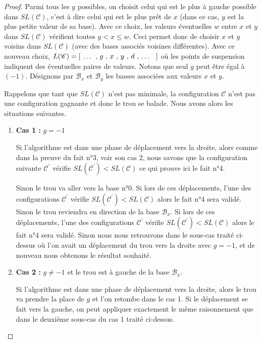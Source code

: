 \begin{proof}
    \medskip

    Parmi tous les $y$ possibles, on choisit celui qui est le plus à gauche possible dans $SL(\mathscr{C})$, c'est à dire celui qui est le plus prêt de $x$ (dans ce cas, $y$ est la plus petite valeur de sa base).
    Avec ce choix, les valeurs éventuelles $w$ entre $x$ et $y$ dans $SL(\mathscr{C})$ vérifient toutes $y < x \leqslant w$. Ceci permet donc de choisir $x$ et $y$ voisins dans $SL(\mathscr{C})$ (avec des bases associés voisines différentes).
    Avec ce nouveau choix, $L(\mathscr{C}) = [ \text{\ \dots{} , $g$ , $x$ , $y$ , $d$ , \dots{} \ } ]$ où les points de suspension indiquent des éventuelles paires de valeurs. Notons que seul $g$ peut être égal à $(-1)$.
    Désignons par $\mathcal{B}_x$ et $\mathcal{B}_y$ les basses associées aux valeurs $x$ et $y$.


    \medskip

    Rappelons que tant que $SL(\mathscr{C})$ n'est pas minimale, la configuration $\mathscr{C}$ n'est pas une configuration gagnante et donc le trou se balade. Nous avons alors les situations suivantes.

    \begin{enumerate}
        \item \textbf{Cas 1 :} $g = -1$

        Si l'algorithme est dans une phase de déplacement vers la droite, alors comme dans la preuve du fait n°3, voir son cas 2, nous savons que la configuration suivante $\mathscr{C}^\prime$ vérifie $SL(\mathscr{C}^\prime) < SL(\mathscr{C})$ ce qui prouve ici le fait n°4.

        Sinon le trou va aller vers la base n°0. Si lors de ces déplacements, l'une des configurations $\mathscr{C}^\prime$ vérifie $SL(\mathscr{C}^\prime) < SL(\mathscr{C})$ alors le fait n°4 sera validé. Sinon le trou reviendra en direction de la base $\mathcal{B}_x$. Si lors de ces déplacements, l'une des configurations $\mathscr{C}^\prime$ vérifie $SL(\mathscr{C}^\prime) < SL(\mathscr{C})$ alors le fait n°4 sera validé. Sinon nous nous retrouvons dans le sous-cas traité ci-dessus où l'on avait un déplacement du trou vers la droite avec $g = -1$, et de nouveau nous obtenons le résultat souhaité.

        \item \textbf{Cas 2 :} $g \neq -1$ et le trou est à gauche de la base $\mathcal{B}_x$.

        Si l'algorithme est dans une phase de déplacement vers la droite, alors le trou va prendre la place de $g$ et l'on retombe dans le cas 1. Si le déplacement se fait vers la gauche, on peut appliquer exactement le même raisonnement que dans le deuxième sous-cas du cas 1 traité ci-dessus.


\end{enumerate}
\end{proof}
